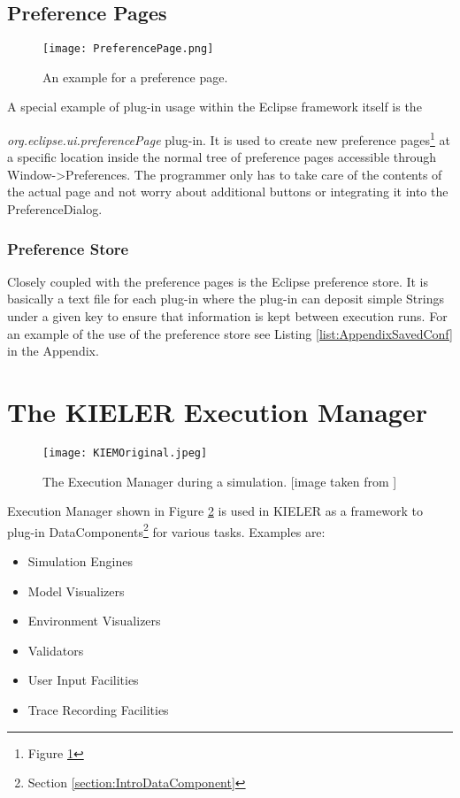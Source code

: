 \subsection{Preference Pages}
\label{section:TechPreferencePage}
\begin{figure}
  \centering
  \texttt{[image: PreferencePage.png]}
  \caption[An example for a preference page.]%
  {An example for a preference page.\protect}
  \label{fig:PreferencePage}
\end{figure}
A special example of plug-in usage within the Eclipse framework itself is the 

\textit{org.eclipse.ui.preferencePage} plug-in. 
It is used to create new preference pages\footnote{Figure \ref{fig:PreferencePage}}
at a specific location inside the normal tree of preference pages accessible through Window->Preferences.
The programmer only has to take care of the contents of the actual page and not worry
about additional buttons or integrating it into the PreferenceDialog.

\subsubsection{Preference Store}
\label{section:TechPreferenceStore}
Closely coupled with the preference pages is the Eclipse preference store. It is
basically a text file for each plug-in where the plug-in can deposit simple Strings
under a given key to ensure that information is kept between execution runs. For
an example of the use of the preference store see Listing \ref{list:AppendixSavedConf}
in the Appendix.

\section{The KIELER Execution Manager}
\label{section:introKiem}
\begin{figure}
  \centering
  \texttt{[image: KIEMOriginal.jpeg]}
  \caption[The Execution Manager during a simulation.]%
  {The Execution Manager during a simulation. [image taken from \cite{cmot-dt}]\protect}
  \label{fig:KIEMOriginal}
\end{figure}

Execution Manager shown in Figure \ref{fig:KIEMOriginal} is used in \ac{KIELER} as a framework 
to plug-in DataComponents\footnote{Section \ref{section:IntroDataComponent}} for various tasks. Examples are:
\begin{itemize}
 \item Simulation Engines
 \item Model Visualizers
 \item Environment Visualizers
 \item Validators
 \item User Input Facilities
 \item Trace Recording Facilities 
\end{itemize}

